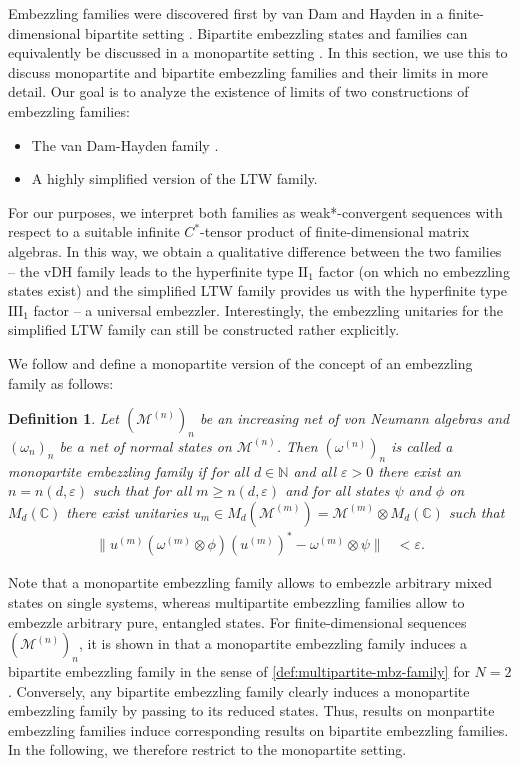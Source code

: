 \documentclass[a4paper, 10pt, onecolumn, accepted=2025-07-22]{quantumarticle}
\newtheorem{definition}[theorem]{Definition}
\theoremstyle{definition}
\newcommand{\norm}[1]{\lVert #1\rVert}
\newcommand{\ox}{\otimes}
\newcommand{\mc}{\mathcal}
\newcommand{\eps}{\varepsilon}
\newcommand{\III}{{\mathrm{III}}}
\newcommand{\II}{{\mathrm{II}}}
\newcommand{\up}[1]{^{(#1)}}
\def\CC{{\mathbb C}}
\def\M{{\mc M}}
\def\NN{{\mathbb N}}
\newcommand*{\1}{\text{\usefont{U}{bbold}{m}{n}1}}
\begin{document}
Embezzling families were discovered first by van Dam and Hayden in a finite-dimensional bipartite setting \cite{van_dam2003universal}. Bipartite embezzling states and families can equivalently be discussed in a monopartite setting \cite{long_paper}. In this section, we use this to discuss monopartite and bipartite embezzling families and their limits in more detail. 
Our goal is to analyze the existence of limits of two constructions of embezzling families: 
\begin{itemize}
    \item[(1)] \label{it:vdh} The van Dam-Hayden family \cite{van_dam2003universal}.
    \item[(2)] \label{it:ltw} A highly simplified version of the LTW family.
\end{itemize}
For our purposes, we interpret both families as weak*-convergent sequences with respect to a suitable infinite $C^{*}$-tensor product of finite-dimensional matrix algebras. In this way, we obtain a qualitative difference between the two families -- the vDH family leads to the hyperfinite type $\II_{1}$ factor (on which no embezzling states exist) and the simplified LTW family provides us with the hyperfinite type $\III_{1}$ factor -- a universal embezzler. Interestingly, the embezzling unitaries for the simplified LTW family can still be constructed rather explicitly.

We follow \cite{van_luijk_critical_2024} and define a monopartite version of the concept of an embezzling family as follows:
\begin{definition}
\label{def:mbzfam}
    Let $(\M\up{n})_n$ be an increasing net of von Neumann algebras and $(\omega_n)_{n}$ be a net of normal states on $\M\up{n}$.
    Then $(\omega\up{n})_{n}$ is called a \emph{monopartite} embezzling family if for all $d\in\NN$ and all $\eps>0$ there exist an $n=n(d,\eps)$ such that for all $m\ge n(d,\eps)$ and for all states $\psi$ and $\phi$ on $M_{d}(\CC)$ there exist unitaries $u_{m}\in M_{d}(\M\up{m}) = \M\up{m}\ox M_{d}(\CC)$ such that
    \begin{align}
        \norm{u\up{m}(\omega\up{m}\ox\phi)(u\up{m})^{*}-\omega\up{m}\ox\psi} & < \eps.
    \end{align}
\end{definition}
Note that a monopartite embezzling family allows to embezzle arbitrary mixed states on single systems, whereas multipartite embezzling families allow to embezzle arbitrary pure, entangled states. 
For finite-dimensional sequences $(\M\up{n})_{n}$, it is shown in \cite[Prop.~33]{van_luijk_critical_2024} that a monopartite embezzling family induces a bipartite embezzling family in the sense of \cref{def:multipartite-mbz-family} for $N=2$. Conversely, any bipartite embezzling family clearly induces a monopartite embezzling family by passing to its reduced states. Thus, results on monpartite embezzling families induce corresponding results on bipartite embezzling families.  In the following, we therefore restrict to the monopartite setting.
\end{document}

